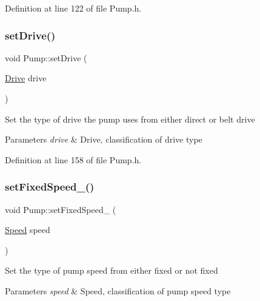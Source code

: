 Definition at line 122 of file Pump.\+h.

\mbox{\label{class_pump_a54b6fc1aa44cc8377914ccb94738723a}} 
\subsubsection{\texorpdfstring{set\+Drive()}{setDrive()}}
{\footnotesize\ttfamily void Pump\+::set\+Drive (\begin{DoxyParamCaption}\item[{\hyperlink{class_pump_a32bf0ade131a11bb3b3fb374f638e983}{Drive}}]{drive }\end{DoxyParamCaption})\hspace{0.3cm}{\ttfamily [inline]}}

Set the type of drive the pump uses from either direct or belt drive


\begin{DoxyParams}{Parameters}
{\em drive} & Drive, classification of drive type \\
\hline
\end{DoxyParams}


Definition at line 158 of file Pump.\+h.

\mbox{\label{class_pump_a9e74b484f468a14076fb12d8b991e24b}} 
\subsubsection{\texorpdfstring{set\+Fixed\+Speed\+\_\+()}{setFixedSpeed\_()}}
{\footnotesize\ttfamily void Pump\+::set\+Fixed\+Speed\+\_\+ (\begin{DoxyParamCaption}\item[{\hyperlink{class_pump_ae443603074ebca82f0b89209482d10b6}{Speed}}]{speed }\end{DoxyParamCaption})\hspace{0.3cm}{\ttfamily [inline]}}

Set the type of pump speed from either fixed or not fixed


\begin{DoxyParams}{Parameters}
{\em speed} & Speed, classification of pump speed type \\
\hline
\end{DoxyParams}


